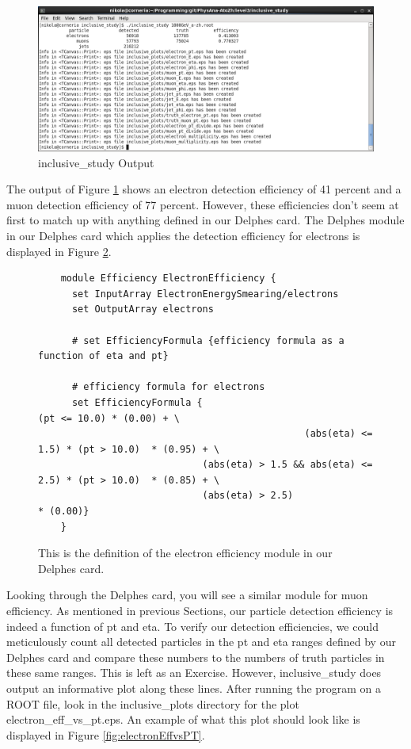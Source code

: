 \documentclass{article}
\begin{document}
\begin{figure}[!htbp]
	\centering
	\includegraphics[width = \linewidth]{inclusive_output_screenshot.png}
	\caption{inclusive\_study Output}
	\label{fig:inclusiveOutput}
\end{figure}

\bigskip

The output of Figure \ref{fig:inclusiveOutput} shows an electron detection efficiency of 41 percent and a muon detection efficiency
of 77 percent. However, these efficiencies don't seem at first to match up with anything defined in our Delphes card. The Delphes
module in our Delphes card which applies the detection efficiency for electrons is displayed in Figure \ref{fig:effModule}.

\begin{figure}[!htbp]
	\centering
	\begin{verbatim}
	module Efficiency ElectronEfficiency {
	  set InputArray ElectronEnergySmearing/electrons
	  set OutputArray electrons
	
	  # set EfficiencyFormula {efficiency formula as a function of eta and pt}
	
	  # efficiency formula for electrons
	  set EfficiencyFormula {                                      (pt <= 10.0) * (0.00) + \
	                                           (abs(eta) <= 1.5) * (pt > 10.0)  * (0.95) + \
	                         (abs(eta) > 1.5 && abs(eta) <= 2.5) * (pt > 10.0)  * (0.85) + \
	                         (abs(eta) > 2.5)                                   * (0.00)}
	}
	\end{verbatim}
	\caption{This is the definition of the electron efficiency module in our Delphes card.}
	\label{fig:effModule}
\end{figure}

\bigskip

Looking through the Delphes card, you will see a similar module for muon efficiency.
As mentioned in previous Sections, our particle detection efficiency is indeed a function of pt and eta.
To verify our detection efficiencies, we could meticulously count all detected particles
in the pt and eta ranges defined by our Delphes card and compare these numbers to the
numbers of truth particles in these same ranges. This is left as an Exercise. However, inclusive\_study
does output an informative plot along these lines. After running the program on a ROOT file, look in
the inclusive\_plots directory for the plot electron\_eff\_vs\_pt.eps. An example of what this plot should
look like is displayed in Figure \ref{fig:electronEffvsPT}.
\end{document}
